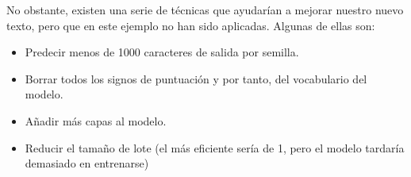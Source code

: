 No obstante, existen una serie de técnicas que ayudarían a mejorar nuestro nuevo texto, pero que en este ejemplo no han sido aplicadas. Algunas de ellas son:
\begin{itemize}[noitemsep]
\item Predecir menos de 1000 caracteres de salida por semilla.
\item Borrar todos los signos de puntuación y por tanto, del vocabulario del modelo.
\item Añadir más capas al modelo.
\item Reducir el tamaño de lote (el más eficiente sería de 1, pero el modelo tardaría demasiado en entrenarse)
\end{itemize}
